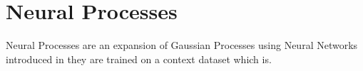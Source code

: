 \documentclass[main.tex]{subfiles}
\begin{document}
\section{Neural Processes}

Neural Processes are an expansion of Gaussian Processes using Neural Networks introduced in \cite{garnelo2018neural} they are trained on a context dataset which is.


\ifSubfilesClassLoaded{%
    \printbibliography{}
}{} 
\end{document}
